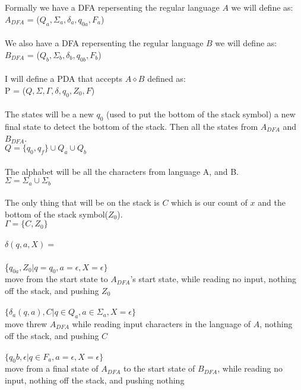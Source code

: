 \documentclass[11pt, oneside]{article}   	%
\begin{document}
\\
\\Formally we have a DFA repersenting the regular language $A$ we will define as:
\\$A_{DFA}$ = ($Q_a,\Sigma_a, \delta_a,q_{0a},F_a$) 
\\
\\We also have a DFA repersenting the regular language $B$ we will define as:
\\$B_{DFA}$ = ($Q_b,\Sigma_b, \delta_b,q_{0b},F_b$) 
\\
\\I will define a PDA that accepts $A \diamond B$ defined as:
\\P = ($Q,\Sigma,\Gamma, \delta,q_0,Z_0,F$)
\\
\\The states will be a new $q_0$ (used to put the bottom of the stack symbol) a new final state to detect the bottom of the stack. Then all the states from $A_{DFA}$ and $B_{DFA}$.
\\$Q = \{q_0, q_f\} \cup Q_a \cup Q_b$
\\
\\The alphabet will be all the characters from language A, and B.
\\$\Sigma = \Sigma_a \cup \Sigma_b$
\\
\\The only thing that will be on the stack is $C$ which is our count of $x$ and the bottom of the stack symbol($Z_0$).
\\$\Gamma = \{C, Z_0\}$
\\
\\$\delta(q,a,X) = $
\\
\\\{$q_{0a}, Z_0 | q = q_0, a = \epsilon, X = \epsilon\}$ 
\\move from the start state to $A_{DFA}$'s start state, while reading no input, nothing off the stack, and pushing $Z_0$
\\
\\$\{\delta_a(q,a), C | q \in Q_a, a \in \Sigma_a, X = \epsilon\}$
\\move threw $A_{DFA}$ while reading input characters in the language of $A$, nothing off the stack, and pushing $C$
\\
\\$\{q_0b,\epsilon | q \in F_a,  a = \epsilon, X = \epsilon\}$ 
\\move from a final state of $A_{DFA}$ to the start state of $B_{DFA}$, while reading no input, nothing off the stack, and pushing nothing
\end{document}
